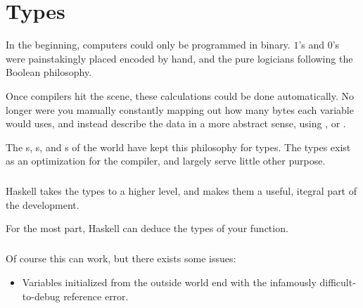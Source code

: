 \chapter{Types}

In the beginning, computers could only be programmed in binary.  $1$'s and $0$'s were painstakingly placed encoded by hand, and the pure logicians following the Boolean philosophy. 

Once compilers hit the scene, these calculations could be done automatically.  No longer were you manually constantly mapping out how many bytes each variable would uses, and instead describe the data in a more abstract sense, using , or . 

The s, s, and s of the world have kept this philosophy for types.  The types exist as an optimization for the compiler, and largely serve little other purpose. 

\paragraph{}
Haskell takes the types to a higher level, and makes them a useful, itegral part of the development.  

For the most part, Haskell can deduce the types of your function. 

\paragraph{}
Of course this can work, but there exists some issues: 
\begin{itemize}
\item Variables initialized from the outside world end with the infamously difficult-to-debug  reference error. 
\end{itemize}
